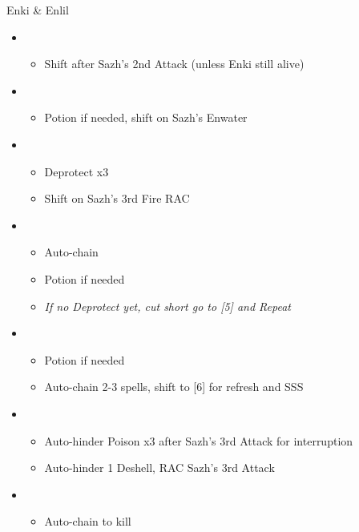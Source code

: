 \begin{battle}[1:39]{Enki \& Enlil}
\begin{itemize}
\begin{itemize}
			      \end{itemize}
			\item \first
				  \begin{itemize}
				  	  \item Shift after Sazh's 2nd Attack (unless Enki still alive)
				  \end{itemize}
			\item \second
			      \begin{itemize}
				      \item Potion if needed, shift on Sazh's Enwater
			      \end{itemize}
			\item \fifth
			      \begin{itemize}
				      \item Deprotect x3
				      \item Shift on Sazh's 3rd Fire RAC
			      \end{itemize}
			\item \fourth
			      \begin{itemize}
				      \item Auto-chain
				      \item Potion if needed
				      \item \textit{If no Deprotect yet, cut short go to [5] and Repeat}
			      \end{itemize}
			\item \first
			      \begin{itemize}
				      \item Potion if needed
				      \item Auto-chain 2-3 spells, shift to [6] for refresh and SSS
			      \end{itemize}
			\item \sixth
			      \begin{itemize}
				      \item Auto-hinder Poison x3 after Sazh's 3rd Attack for interruption
				      \item Auto-hinder 1 Deshell, RAC Sazh's 3rd Attack
			      \end{itemize}
			\item \first
			      \begin{itemize}
				      \item Auto-chain to kill
			      \end{itemize}
		\end{itemize}
\end{battle}
